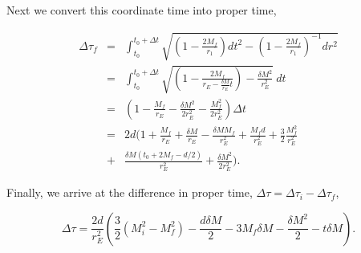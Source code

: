 \documentclass[aps,showpacs,twocolumn,floats,prd,superscriptaddress,nofootinbib]{revtex4-1}
\begin{document}
Next we convert this coordinate time into proper time, 

\begin{eqnarray}
\Delta \tau_f &=& \int_{t_0}^{t_0+\Delta t}
 \sqrt{\left(1-\frac{2M_f}{r_1}\right)dt^2 - \left(1-\frac{2M_f}{r_1}\right)^{-1}dr^2} \nonumber	
 \\ 
&=& \int_{t_0}^{t_0+\Delta t} 
\sqrt{\left(1 - \frac{2M_f}{r_E - \frac{\delta M}{r_E}t}\right) - \frac{\delta M^2}{r_E^2} }
~dt  \nonumber	\\
&=& \left(1 - \frac{M_f}{r_E} - \frac{\delta M^2}{2r_E^2} - \frac{M_f^2}{2 r_E^2} \right)
\Delta t \nonumber \\
&=& 2d ( 1 + \frac{M_f}{r_E} + \frac{\delta M}{r_E} - \frac{\delta M M_f}{r_E^2} + \frac{M_fd}{r_E^2}+ \frac{3}{2} \frac{M_f^2}{r_E^2}	\nonumber	\\
& + & \frac{\delta M (t_0+2M_f-d/2)}{r_E^2} + \frac{\delta M^2}{2r_E^2} ). \label{123}
\end{eqnarray}

Finally, we arrive at the difference in proper time, $\Delta \tau = \Delta \tau_i - \Delta \tau_f$, 

\begin{equation}
	\Delta \tau=  \frac{2d}{r_E^2} \left( \frac{3}{2} (M_i^2 - M_f^2) - \frac{d \delta M}{2} - 3 M_f \delta M - \frac{\delta M^2}{2} - t \delta M  \right).
\end{equation}


\end{document}
